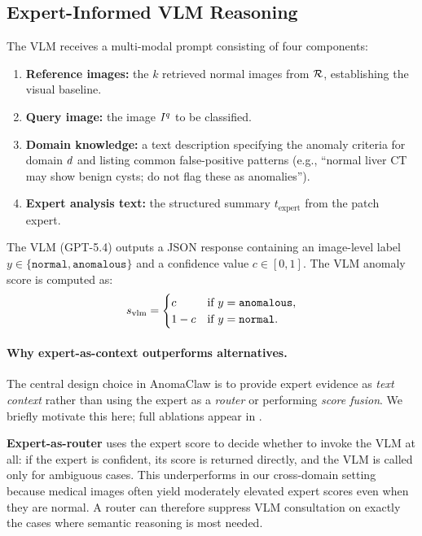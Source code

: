 \subsection{Expert-Informed VLM Reasoning}
\label{sec:vlm}

The VLM receives a multi-modal prompt consisting of four components:
\begin{enumerate}[leftmargin=*,itemsep=1pt]
    \item \textbf{Reference images:} the $k$ retrieved normal images from $\mathcal{R}$, establishing the visual baseline.
    \item \textbf{Query image:} the image $I^q$ to be classified.
    \item \textbf{Domain knowledge:} a text description specifying the anomaly criteria for domain $d$ and listing common false-positive patterns (e.g., ``normal liver CT may show benign cysts; do not flag these as anomalies'').
    \item \textbf{Expert analysis text:} the structured summary $t_{\text{expert}}$ from the patch expert.
\end{enumerate}
The VLM (GPT-5.4) outputs a JSON response containing an image-level label $y \in \{\texttt{normal}, \texttt{anomalous}\}$ and a confidence value $c \in [0,1]$.
The VLM anomaly score is computed as:
\begin{equation}
    s_{\text{vlm}} =
    \begin{cases}
        c & \text{if } y = \texttt{anomalous}, \\
        1 - c & \text{if } y = \texttt{normal}.
    \end{cases}
    \label{eq:vlm_score}
\end{equation}

\paragraph{Why expert-as-context outperforms alternatives.}
The central design choice in AnomaClaw is to provide expert evidence as \emph{text context} rather than using the expert as a \emph{router} or performing \emph{score fusion}.
We briefly motivate this here; full ablations appear in .

\textbf{Expert-as-router} uses the expert score to decide whether to invoke the VLM at all: if the expert is confident, its score is returned directly, and the VLM is called only for ambiguous cases.
This underperforms in our cross-domain setting because medical images often yield moderately elevated expert scores even when they are normal.
A router can therefore suppress VLM consultation on exactly the cases where semantic reasoning is most needed.

